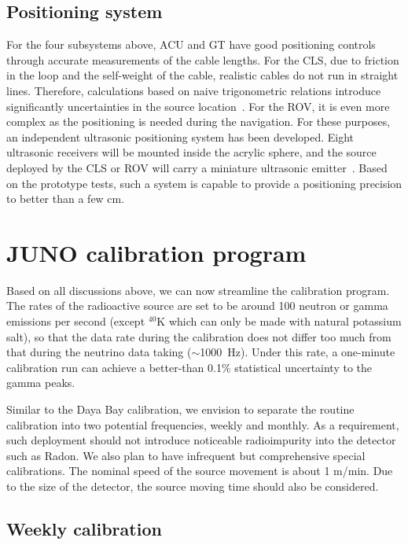 \documentclass[a4paper,10pt,twoside]{cpc-hepnp}
\begin{document}
\begin{CJK*}{GB}{gbsn}
\begin{multicols}{2}
\subsection{Positioning system}
For the four subsystems above, ACU and GT have good positioning
controls through accurate measurements of the cable lengths. For the
CLS, due to friction in the loop and the self-weight of the cable,
realistic cables do not run in straight lines. Therefore,
calculations based on naive trigonometric relations introduce
significantly uncertainties in the source
location~\cite{zhangyuanyuan-new-paper}.  For the ROV, it is even more
complex as the positioning is needed during the navigation. For these
purposes, an independent ultrasonic positioning system has been
developed. Eight ultrasonic receivers will be mounted inside the
acrylic sphere, and the source deployed by the CLS or ROV will carry a
miniature ultrasonic emitter~\cite{NWPU-paper}. Based on the prototype
tests, such a system is capable to provide a positioning precision to
better than a few cm.

\section{JUNO calibration program}
\label{sec:calib_program}
Based on all discussions above, we can now streamline the calibration
program. The rates of the radioactive source are set to be around 100
neutron or gamma emissions per second (except $^{40}$K which can only
be made with natural potassium salt), so that the data rate during the
calibration does not differ too much from that during the neutrino
data taking ($\sim$1000~Hz). Under this rate, a one-minute calibration
run can achieve a better-than 0.1\% statistical uncertainty to the
gamma peaks.

Similar to the Daya Bay calibration, we envision to separate the
routine calibration into two potential frequencies, weekly and monthly. 
As a requirement, such deployment should not introduce noticeable 
radioimpurity into the detector such as Radon.
We also plan to have infrequent but comprehensive special calibrations. 
The nominal speed of the source movement is about 1 m/min. Due to the size of the
detector, the source moving time should also be considered.

\subsection{Weekly calibration}



\end{multicols}
\end{CJK*}
\end{document}
